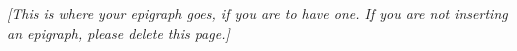 \clearpage
\vspace*{2\worddouble}
{\centering\itshape
[This is where your epigraph goes, if you are to have one. If you are not
inserting an epigraph, please delete this page.]\par}
